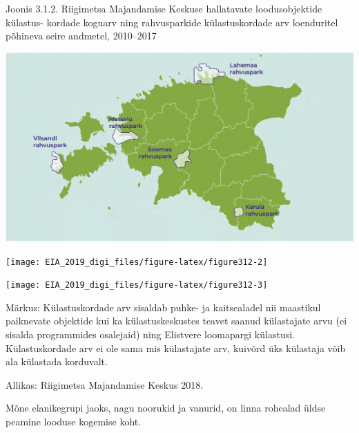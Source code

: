 \documentclass[estonian,]{article}
\begin{document}
{Joonis 3.1.2.} Riigimetsa Majandamise Keskuse hallatavate loodusobjektide külastus- kordade koguarv ning rahvusparkide külastuskordade arv loenduritel põhineva seire andmetel, 2010--2017

\begin{center}\includegraphics[width=0.8\linewidth]{figures/3-chapter/fig312_map} \end{center}

\begin{center}\texttt{[image: EIA\_2019\_digi\_files/figure-latex/figure312-2]} \end{center}

\begin{center}\texttt{[image: EIA\_2019\_digi\_files/figure-latex/figure312-3]} \end{center}

\begin{figure-comment}
{Märkus:} Külastuskordade arv sisaldab puhke- ja kaitsealadel nii
maastikul paiknevate objektide kui ka külastuskeskustes teavet saanud
külastajate arvu (ei sisalda programmides osalejaid) ning Elistvere
loomapargi külastusi. Külastuskordade arv ei ole sama mis külastajate
arv, kuivõrd üks külastaja võib ala külastada korduvalt.
\end{figure-comment}

\begin{imgsource}
{Allikas:} Riigimetsa Majandamise Keskus 2018.
\end{imgsource}

\begin{blockquote-left}
Mõne elanikegrupi jaoks, nagu noorukid ja vanurid, on linna rohealad
üldse peamine looduse kogemise koht.
\end{blockquote-left}
\end{document}

